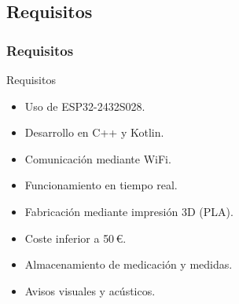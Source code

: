 \documentclass{beamer}
\begin{document}
\subsection{Requisitos}
\begin{frame}
\frametitle{Requisitos}

\begin{block}{Requisitos}
\begin{itemize}
\item Uso de \alert{ESP32-2432S028}.
\item Desarrollo en \alert{C++} y \alert{Kotlin}.
\item Comunicación mediante \alert{WiFi}.
\item Funcionamiento en \alert{tiempo real}.
\item Fabricación mediante \alert{impresión 3D (PLA)}.
\item Coste inferior a \alert{50\,€}.
\item \alert{Almacenamiento} de medicación y medidas.
\item Avisos \alert{visuales y acústicos}.
\end{itemize}
\end{block}


\end{frame}
\end{document}
